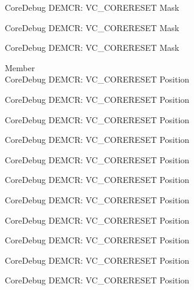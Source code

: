 \begin{DoxyRefList}
\label{deprecated__deprecated001091}%
%
Core\+Debug DEMCR\+: VC\+\_\+\+CORERESET Mask 

\label{deprecated__deprecated001180}%
%
Core\+Debug DEMCR\+: VC\+\_\+\+CORERESET Mask 

\label{deprecated__deprecated001282}%
%
Core\+Debug DEMCR\+: VC\+\_\+\+CORERESET Mask  
\item[Member \doxylink{group___c_m_s_i_s___core_debug_ga9fcf09666f7063a7303117aa32a85d5a}{Core\+Debug\+\_\+\+DEMCR\+\_\+\+VC\+\_\+\+CORERESET\+\_\+\+Pos} ]\hfill \\
\label{deprecated__deprecated000069}%
%
Core\+Debug DEMCR\+: VC\+\_\+\+CORERESET Position 

\label{deprecated__deprecated000137}%
%
Core\+Debug DEMCR\+: VC\+\_\+\+CORERESET Position 

\label{deprecated__deprecated000213}%
%
Core\+Debug DEMCR\+: VC\+\_\+\+CORERESET Position 

\label{deprecated__deprecated000276}%
%
Core\+Debug DEMCR\+: VC\+\_\+\+CORERESET Position 

\label{deprecated__deprecated000355}%
%
Core\+Debug DEMCR\+: VC\+\_\+\+CORERESET Position 

\label{deprecated__deprecated000431}%
%
Core\+Debug DEMCR\+: VC\+\_\+\+CORERESET Position 

\label{deprecated__deprecated000520}%
%
Core\+Debug DEMCR\+: VC\+\_\+\+CORERESET Position 

\label{deprecated__deprecated000622}%
%
Core\+Debug DEMCR\+: VC\+\_\+\+CORERESET Position 

\label{deprecated__deprecated000728}%
%
Core\+Debug DEMCR\+: VC\+\_\+\+CORERESET Position 

\label{deprecated__deprecated000796}%
%
Core\+Debug DEMCR\+: VC\+\_\+\+CORERESET Position 

\label{deprecated__deprecated000872}%
%
Core\+Debug DEMCR\+: VC\+\_\+\+CORERESET Position 


\end{DoxyRefList}
